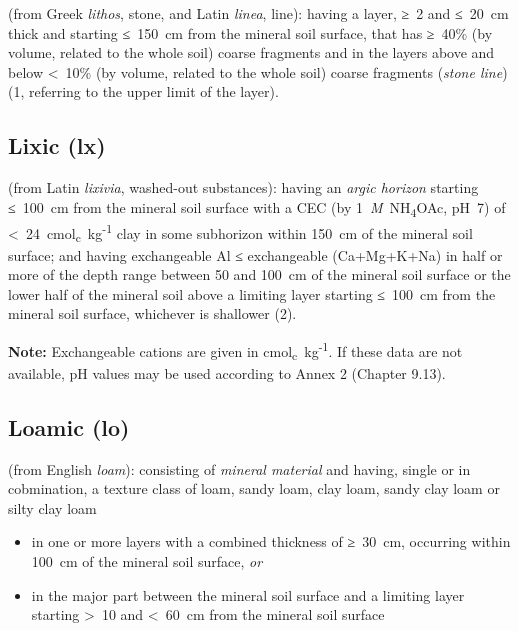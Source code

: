 \documentclass[
  letterpaper,
  DIV=11,
  numbers=noendperiod]{scrreprt}
\providecommand{\tightlist}{%
  \setlength{\itemsep}{0pt}\setlength{\parskip}{0pt}}\usepackage{longtable,booktabs,array}
\begin{document}
(from Greek \emph{lithos}, stone, and Latin \emph{linea}, line): having
a layer, ≥~2 and ≤~20~cm thick and starting ≤~150~cm from the mineral
soil surface, that has ≥~40\% (by volume, related to the whole soil)
coarse fragments and in the layers above and below \textless~10\% (by
volume, related to the whole soil) coarse fragments (\emph{stone line})
(1, referring to the upper limit of the layer).

\hypertarget{lixic-lx}{%
\subsection{Lixic (lx)}\label{lixic-lx}}

(from Latin \emph{lixivia}, washed-out substances): having an
\emph{argic horizon} starting ≤~100~cm from the mineral soil surface
with a CEC (by 1~\emph{M}~NH\textsubscript{4}OAc, pH~7) of
\textless~24~cmol\textsubscript{c}~kg\textsuperscript{-1} clay in some
subhorizon within 150~cm of the mineral soil surface; and having
exchangeable Al ≤ exchangeable (Ca+Mg+K+Na) in half or more of the depth
range between 50 and 100~cm of the mineral soil surface or the lower
half of the mineral soil above a limiting layer starting ≤~100~cm from
the mineral soil surface, whichever is shallower (2).

\textbf{Note:} Exchangeable cations are given in
cmol\textsubscript{c}~kg\textsuperscript{-1}. If these data are not
available, pH values may be used according to Annex 2 (Chapter 9.13).

\hypertarget{loamic-lo}{%
\subsection{Loamic (lo)}\label{loamic-lo}}

(from English \emph{loam}): consisting of \emph{mineral material} and
having, single or in cobmination, a texture class of loam, sandy loam,
clay loam, sandy clay loam or silty clay loam

\begin{itemize}
\tightlist
\item
  in one or more layers with a combined thickness of ≥~30~cm, occurring
  within 100~cm of the mineral soil surface, \emph{or}
\item
  in the major part between the mineral soil surface and a limiting
  layer starting \textgreater~10 and \textless~60~cm from the mineral
  soil surface
\end{itemize}
\end{document}
